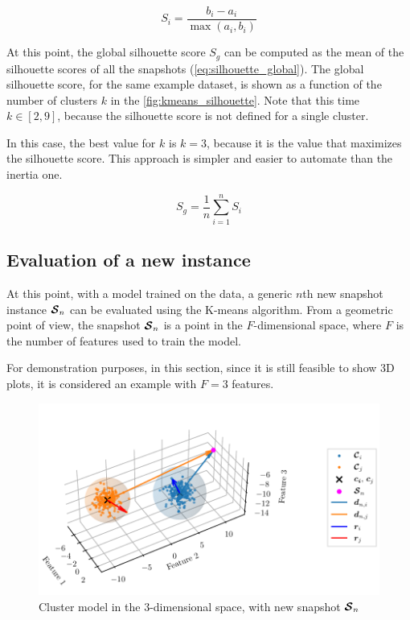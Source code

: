 \begin{equation}
  \label{eq:silhouette}
  S_i = \frac{b_i - a_i}{\max{(a_i,b_i)}}
\end{equation}

At this point, the global silhouette score $S_g$ can be computed as the mean of the silhouette scores of all the snapshots (\autoref{eq:silhouette_global}). The global silhouette score, for the same example dataset, is shown as a function of the number of clusters $k$ in the \autoref{fig:kmeans_silhouette}. Note that this time $k \in [2,9]$, because the silhouette score is not defined for a single cluster.

In this case, the best value for $k$ is $k=3$, because it is the value that maximizes the silhouette score. This approach is simpler and easier to automate than the inertia one. 

\begin{equation}
  \label{eq:silhouette_global}
  S_g = \frac{1}{n}\sum_{i=1}^{n} S_i
\end{equation}


\subsection{Evaluation of a new instance}

At this point, with a model trained on the data, a generic $n$th new snapshot instance $\bm{\mathcal{S}}_n$ can be evaluated using the K-means algorithm.
From a geometric point of view, the snapshot $\bm{\mathcal{S}}_n$ is a point in the ${F}$-dimensional space, where ${F}$ is the number of features used to train the model.

For demonstration purposes, in this section, since it is still feasible to show 3D plots, it is considered an example with ${F}=3$ features.

\begin{figure}[htbp]
  \centering
  \includegraphics[width=\textwidth]{images/Spheres_2.pdf}
  \caption{Cluster model in the $3$-dimensional space, with new snapshot $\bm{\mathcal{S}}_n$}
  \label{fig:clust_spheres}
\end{figure}


